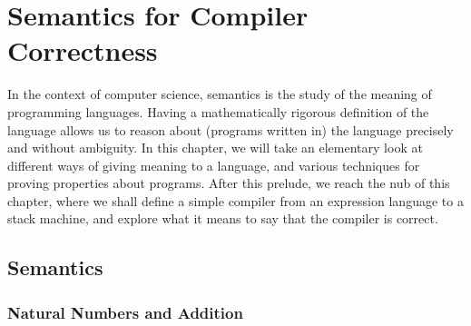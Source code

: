 
\def\prod{\mathrel{::=}}
\def\altn{\mathrel{\mid}}
\def\NT#1{\textsf{#1}}
\def\TT#1{\texttt{#1}}
\def\Nat{\mathbb{N}}

\def\Expression{\NT{Expression}}
\def\Add{\oplus}
\def\PUSH{\TT{PUSH}\;}
\def\ADD{\TT{ADD}}
\def\nil{\TT{[]}}
\def\Instruction{\NT{Instruction}}
\def\Code{\NT{Code}}
\def\Stack{\NT{Stack}}
\def\Machine{\NT{Machine}}
\def\compile{\textit{compile}}

\def\Eval{\Downarrow}
\def\Step{\mapsto}
\def\StepS{\Step^\star}
\def\Exec{\rightarrowtail}
\def\ExecS{\Exec^\star}

\chapter{Semantics for Compiler Correctness}\label{ch:semantics}


In the context of computer science, semantics is the study of the meaning of
programming languages. Having a mathematically rigorous definition of the
language allows us to reason about (programs written in) the language
precisely and without ambiguity. In this chapter, we will take an elementary
look at different ways of giving meaning to a language, and various
techniques for proving properties about programs. After this prelude, we
reach the nub of this chapter, where we shall define a simple compiler from
an expression language to a stack machine, and explore what it means to say
that the compiler is correct.

\section{Semantics}%

\subsection{Natural Numbers and Addition}%

